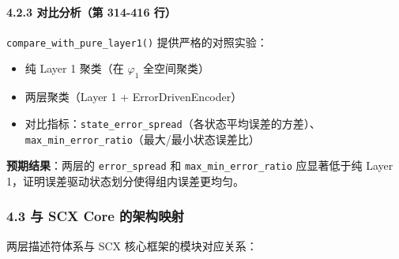 \documentclass[
  12pt,
]{ctexart}
\providecommand{\tightlist}{%
  \setlength{\itemsep}{0pt}\setlength{\parskip}{0pt}}
\begin{document}
\paragraph{4.2.3 对比分析（第 314-416
行）}\label{ux5bf9ux6bd4ux5206ux6790ux7b2c-314-416-ux884c}

\texttt{compare\_with\_pure\_layer1()} 提供严格的对照实验：

\begin{itemize}
\tightlist
\item
  纯 Layer 1 聚类（在 \(\varphi_1\) 全空间聚类）
\item
  两层聚类（Layer 1 + ErrorDrivenEncoder）
\item
  对比指标：\texttt{state\_error\_spread}（各状态平均误差的方差）、\texttt{max\_min\_error\_ratio}（最大/最小状态误差比）
\end{itemize}

\textbf{预期结果}：两层的 \texttt{error\_spread} 和
\texttt{max\_min\_error\_ratio} 应显著低于纯 Layer
1，证明误差驱动状态划分使得组内误差更均匀。

\subsubsection{4.3 与 SCX Core
的架构映射}\label{ux4e0e-scx-core-ux7684ux67b6ux6784ux6620ux5c04}

两层描述符体系与 SCX 核心框架的模块对应关系：
\end{document}
